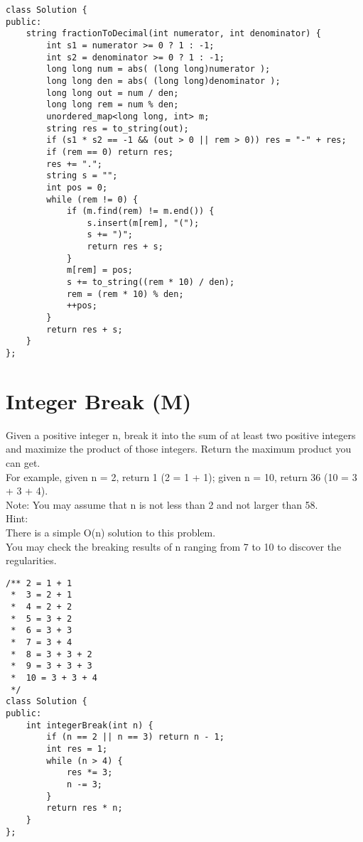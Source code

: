 \begin{lstlisting}
class Solution {
public:
    string fractionToDecimal(int numerator, int denominator) {
        int s1 = numerator >= 0 ? 1 : -1;
        int s2 = denominator >= 0 ? 1 : -1;
        long long num = abs( (long long)numerator );
        long long den = abs( (long long)denominator );
        long long out = num / den;
        long long rem = num % den;
        unordered_map<long long, int> m;
        string res = to_string(out);
        if (s1 * s2 == -1 && (out > 0 || rem > 0)) res = "-" + res;
        if (rem == 0) return res;
        res += ".";
        string s = "";
        int pos = 0;
        while (rem != 0) {
            if (m.find(rem) != m.end()) {
                s.insert(m[rem], "(");
                s += ")";
                return res + s;
            }
            m[rem] = pos;
            s += to_string((rem * 10) / den);
            rem = (rem * 10) % den;
            ++pos;
        }
        return res + s;
    }
};
\end{lstlisting}


\section{Integer Break (M)}
Given a positive integer n, break it into the sum of at least two positive integers and maximize the product of those integers. Return the maximum product you can get.\\

For example, given n = 2, return 1 (2 = 1 + 1); given n = 10, return 36 (10 = 3 + 3 + 4).\\

Note: You may assume that n is not less than 2 and not larger than 58.\\

Hint:\\
    There is a simple O(n) solution to this problem.\\
    You may check the breaking results of n ranging from 7 to 10 to discover the regularities.\\

\begin{lstlisting}
/** 2 = 1 + 1
 *  3 = 2 + 1
 *  4 = 2 + 2
 *  5 = 3 + 2
 *  6 = 3 + 3
 *  7 = 3 + 4
 *  8 = 3 + 3 + 2
 *  9 = 3 + 3 + 3
 *  10 = 3 + 3 + 4
 */
class Solution {
public:
    int integerBreak(int n) {
        if (n == 2 || n == 3) return n - 1;
        int res = 1;
        while (n > 4) {
            res *= 3;
            n -= 3;
        }
        return res * n;
    }
};
\end{lstlisting}


